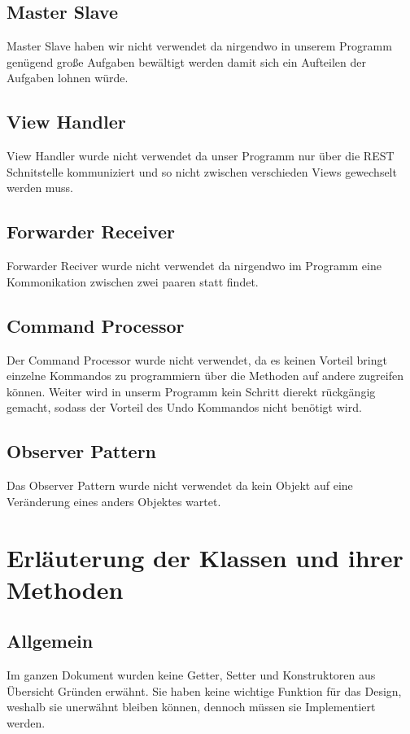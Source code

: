 \documentclass{book}
\begin{document}
\section{Master Slave}
Master Slave haben wir nicht verwendet da nirgendwo in unserem Programm genügend große Aufgaben bewältigt werden damit sich ein Aufteilen der Aufgaben lohnen würde. 

\section{View Handler}
View Handler wurde nicht verwendet da unser Programm nur über die REST Schnitstelle kommuniziert und so nicht zwischen verschieden Views gewechselt werden muss.

\section{Forwarder Receiver}
Forwarder Reciver wurde nicht verwendet da nirgendwo im Programm eine Kommonikation zwischen zwei paaren statt findet. 

\section{Command Processor}
Der Command Processor wurde nicht verwendet, da es keinen Vorteil bringt einzelne Kommandos zu programmiern über die Methoden auf andere zugreifen können. Weiter wird in unserm Programm kein Schritt dierekt rückgängig gemacht,
sodass der Vorteil des Undo Kommandos nicht benötigt wird. 

\section{Observer Pattern}
Das Observer Pattern wurde nicht verwendet da kein Objekt auf eine Veränderung eines anders Objektes wartet.


\chapter{Erläuterung der Klassen und ihrer Methoden}

\section{Allgemein}
Im ganzen Dokument wurden keine Getter, Setter und Konstruktoren aus Übersicht Gründen erwähnt. Sie haben keine wichtige Funktion für das Design, weshalb sie unerwähnt bleiben können, dennoch müssen sie Implementiert werden.
\end{document}
